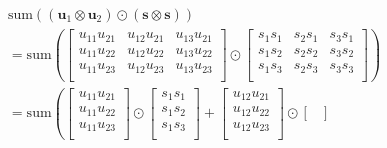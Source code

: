 \begin{align*}
   & \mathrm{sum}\left((\textbf{u}_1 \otimes \textbf{u}_2) \odot (\textbf{s} \otimes \textbf{s} )\right)                                                             \\
   & = \mathrm{sum}\left(\begin{bmatrix}
                             u_{11}u_{21} & u_{12}u_{21} & u_{13}u_{21} \\
                             u_{11}u_{22} & u_{12}u_{22} & u_{13}u_{22} \\
                             u_{11}u_{23} & u_{12}u_{23} & u_{13}u_{23} \\
                           \end{bmatrix} \odot \begin{bmatrix}
                                                 s_{1}s_{1} & s_{2}s_{1} & s_{3}s_{1} \\
                                                 s_{1}s_{2} & s_{2}s_{2} & s_{3}s_{2} \\
                                                 s_{1}s_{3} & s_{2}s_{3} & s_{3}s_{3} \\
                                               \end{bmatrix}\right)                                                                                 \\
   & = \mathrm{sum}\left(\begin{bmatrix}
                             u_{11}u_{21} \\
                             u_{11}u_{22} \\
                             u_{11}u_{23} \\
                           \end{bmatrix} \odot \begin{bmatrix}
                                                 s_{1}s_{1} \\
                                                 s_{1}s_{2} \\
                                                 s_{1}s_{3} \\
                                               \end{bmatrix}
  + \begin{bmatrix}
        u_{12}u_{21} \\
        u_{12}u_{22} \\
        u_{12}u_{23} \\
      \end{bmatrix} \odot \begin{bmatrix}

\end{bmatrix}
\end{align*}
